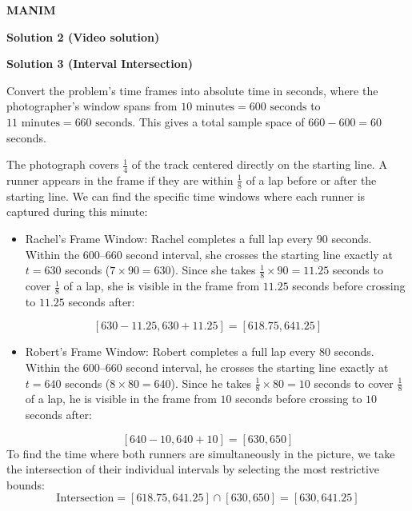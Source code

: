 \begin{enumerate}
 


 


 \textbf{MANIM} 



\textbf{Solution 2 (Video solution)}






\textbf{Solution 3 (Interval Intersection)}

Convert the problem's time frames into absolute time in seconds, where the photographer's window spans from $10 \text{ minutes} = 600 \text{ seconds}$ to $11 \text{ minutes} = 660 \text{ seconds}$. This gives a total sample space of $660 - 600 = 60$ seconds.

 The photograph covers $\frac{1}{4}$ of the track centered directly on the starting line. A runner appears in the frame if they are within $\frac{1}{8}$ of a lap before or after the starting line. We can find the specific time windows where each runner is captured during this minute:


 
            \begin{itemize}
        \item Rachel's Frame Window: Rachel completes a full lap every $90$ seconds. Within the $600\text{--}660$ second interval, she crosses the starting line exactly at $t = 630$ seconds ($7 \times 90 = 630$). Since she takes $\frac{1}{8} \times 90 = 11.25$ seconds to cover $\frac{1}{8}$ of a lap, she is visible in the frame from $11.25$ seconds before crossing to $11.25$ seconds after:
            \end{itemize}
            
 \[[630 - 11.25, 630 + 11.25] = [618.75, 641.25]\]

            \begin{itemize}
        \item Robert's Frame Window: Robert completes a full lap every $80$ seconds. Within the $600\text{--}660$ second interval, he crosses the starting line exactly at $t = 640$ seconds ($8 \times 80 = 640$). Since he takes $\frac{1}{8} \times 80 = 10$ seconds to cover $\frac{1}{8}$ of a lap, he is visible in the frame from $10$ seconds before crossing to $10$ seconds after:
            \end{itemize}
            
 \[[640 - 10, 640 + 10] = [630, 650]\]
To find the time where both runners are simultaneously in the picture, we take the intersection of their individual intervals by selecting the most restrictive bounds:
 \[\text{Intersection} = [618.75, 641.25] \cap [630, 650] = [630, 641.25]\]


\end{enumerate}
